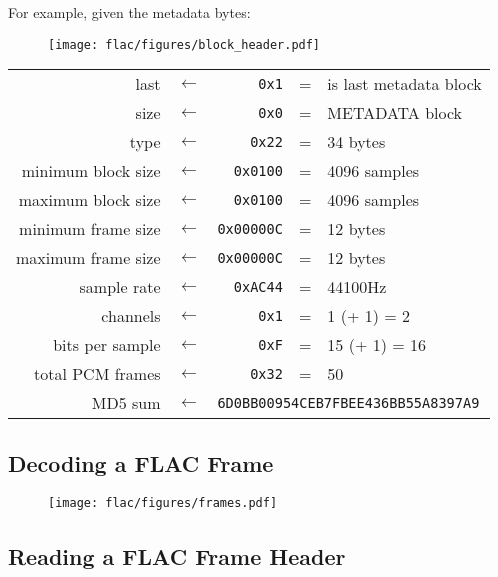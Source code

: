 For example, given the metadata bytes:
\begin{figure}[h]
\texttt{[image: flac/figures/block\_header.pdf]}
\end{figure}
\par
\noindent
\begin{tabular}{rcrcl}
\textsf{last} & $\leftarrow$ & \texttt{0x1} & = & is last metadata block \\
\textsf{size} & $\leftarrow$ & \texttt{0x0} & = & METADATA block \\
\textsf{type} & $\leftarrow$ & \texttt{0x22} & = & 34 bytes \\
\textsf{minimum block size} & $\leftarrow$ & \texttt{0x0100} & = & 4096 samples \\
\textsf{maximum block size} & $\leftarrow$ & \texttt{0x0100} & = & 4096 samples \\
\textsf{minimum frame size} & $\leftarrow$ & \texttt{0x00000C} & = & 12 bytes \\
\textsf{maximum frame size} & $\leftarrow$ & \texttt{0x00000C} & = & 12 bytes \\
\textsf{sample rate} & $\leftarrow$ & \texttt{0xAC44} & = & 44100Hz \\
\textsf{channels} & $\leftarrow$ & \texttt{0x1} & = & 1 (+ 1) = 2 \\
\textsf{bits per sample} & $\leftarrow$ & \texttt{0xF} & = & 15 (+ 1) = 16 \\
\textsf{total PCM frames} & $\leftarrow$ & \texttt{0x32} & = & 50 \\
\textsf{MD5 sum} & $\leftarrow$ & \multicolumn{3}{l}{\texttt{6D0BB00954CEB7FBEE436BB55A8397A9}} \\
\end{tabular}

\clearpage

\subsection{Decoding a FLAC Frame}
\label{flac:decode_frame}
{

}
\begin{figure}[h]
\texttt{[image: flac/figures/frames.pdf]}
\end{figure}

\clearpage

\subsection{Reading a FLAC Frame Header}
\label{flac:read_frame_header}


